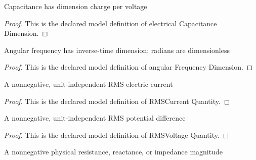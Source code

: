 \begin{definition}
  \label{def:physics:phyx-mini-0943:phyxminiproblems-problemphyxmini0943-electricalcapacitancedimension}
  Capacitance has dimension charge per voltage
\end{definition}
\begin{proof}
  This is the declared model definition of electrical Capacitance Dimension.
\end{proof}
\begin{definition}
  \label{def:physics:phyx-mini-0943:phyxminiproblems-problemphyxmini0943-angularfrequencydimension}
  Angular frequency has inverse-time dimension; radians are dimensionless
\end{definition}
\begin{proof}
  This is the declared model definition of angular Frequency Dimension.
\end{proof}
\begin{definition}
  \label{def:physics:phyx-mini-0943:phyxminiproblems-problemphyxmini0943-rmscurrentquantity}
  A nonnegative, unit-independent RMS electric current
\end{definition}
\begin{proof}
  This is the declared model definition of RMSCurrent Quantity.
\end{proof}
\begin{definition}
  \label{def:physics:phyx-mini-0943:phyxminiproblems-problemphyxmini0943-rmsvoltagequantity}
  A nonnegative, unit-independent RMS potential difference
\end{definition}
\begin{proof}
  This is the declared model definition of RMSVoltage Quantity.
\end{proof}
\begin{definition}
  \label{def:physics:phyx-mini-0943:phyxminiproblems-problemphyxmini0943-resistancemagnitudequantity}
  A nonnegative physical resistance, reactance, or impedance magnitude
\end{definition}
